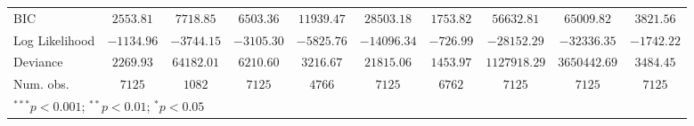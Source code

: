 \begin{tabular}{l c c c c c c c c c}
BIC              & $2553.81$     & $7718.85$     & $6503.36$     & $11939.47$    & $28503.18$    & $1753.82$      & $56632.81$    & $65009.82$    & $3821.56$      \\
Log Likelihood   & $-1134.96$    & $-3744.15$    & $-3105.30$    & $-5825.76$    & $-14096.34$   & $-726.99$      & $-28152.29$   & $-32336.35$   & $-1742.22$     \\
Deviance         & $2269.93$     & $64182.01$    & $6210.60$     & $3216.67$     & $21815.06$    & $1453.97$      & $1127918.29$  & $3650442.69$  & $3484.45$      \\
Num. obs.        & $7125$        & $1082$        & $7125$        & $4766$        & $7125$        & $6762$         & $7125$        & $7125$        & $7125$         \\
\bottomrule
\multicolumn{10}{l}{\scriptsize{$^{***}p<0.001$; $^{**}p<0.01$; $^{*}p<0.05$}}
\end{tabular}
